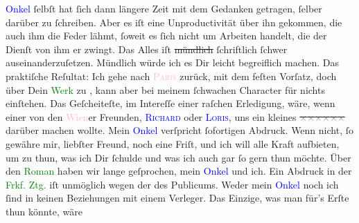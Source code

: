 \documentclass[twoside=false,titlepage=false,open=any, parskip=never, fontsize=12pt, headings=small, chapterprefix=false, appendixprefix=false]{scrbook}
\newcommand{\strikeout}[1]{\sout{#1}}
\newcommand{\Theight}{\dimexpr\fontcharht\font`W}
\newcommand{\pbposition}{\depth}
\newcommand{\pb}{\nobreak\hspace{0pt}\raisebox{-0.1em}{\raisebox{\pbposition}{\textnormal{|}}}\nobreak\hspace{0pt}}
\newcommand{\introOben}{\textnormal{\raisebox{\Theight}{\raisebox{-\height}{\small{v}\normalsize}}}}
\begin{document}
                  \textcolor{blue}{Onkel}{} ſelbſt hat ſich dann
               längere Zeit mit dem Gedanken getragen, ſelber darüber zu ſchreiben. Aber es iſt eine
               Unproductivität über ihn gekommen, die auch ihm die Feder lähmt, ſoweit es ſich nicht
               um Arbeiten handelt, die der Dienſt von ihm er zwingt. Das Alles iſt {\pb}\strikeout{mündlich} ſchriftlich ſchwer auseinanderzuſetzen.
               Mündlich würde ich es Dir leicht begreiflich machen. Das praktiſche Reſultat: Ich
               gehe nach \textcolor{pink}{\textsc{Paris}}{}\ledrightnote{\textcolor{pink}{Paris}} zurück, mit dem feſten Vorſatz, doch über Dein \textcolor{green}{Werk}{} zu \label{K_L02709-7v}\label{K_L02709-7h}, kann aber bei meinem ſchwachen Character für nichts einſtehen.
               Das Geſcheiteſte, im Intereſſe einer raſchen Erledigung, wäre, wenn einer von den \textcolor{pink}{Wien}{}\ledrightnote{\textcolor{pink}{Wien}}er Freunden, \textsc{\textcolor{blue}{Richard}{}\ledrightnote{\textcolor{blue}{Richard Beer-Hofmann}}} oder \textsc{\textcolor{blue}{Loris}{}\ledrightnote{\textcolor{blue}{Hugo von Hofmannsthal}}}, uns ein kleines \introOben{}\label{K_L02709-8v}\label{K_L02709-8h}\introOben{}{ }\strikeout{\textcolor{gray}{×}\-\textcolor{gray}{×}\-\textcolor{gray}{×}\-\textcolor{gray}{×}\-\textcolor{gray}{×}\-\textcolor{gray}{×}} darüber machen wollte. Mein \textcolor{blue}{Onkel}{} verſpricht {\pb}ſofortigen Abdruck. Wenn
               nicht, ſo gewähre mir, liebſter Freund, noch eine Friſt, und ich will alle Kraft
               aufbieten, um zu thun, was ich Dir ſchulde und was ich auch gar ſo gern thun
               möchte.\pend
           \pstart
           Über den \textcolor{green}{Roman}{} haben wir lange
               geſprochen, mein \textcolor{blue}{Onkel}{} und
               ich. Ein Abdruck in der \textcolor{green}{Frkf. Ztg.}{}\ledrightnote{\textcolor{green}{Frankfurter Zeitung}} iſt unmöglich
               wegen der \label{K_L02709-4v}\label{K_L02709-4h}
               des Publicums. Weder mein \textcolor{blue}{Onkel}{} noch ich ſind in keinen Beziehungen mit einem Verleger. {\pb}Das Einzige, was man für’s Erſte thun könnte, wäre
\end{document}

